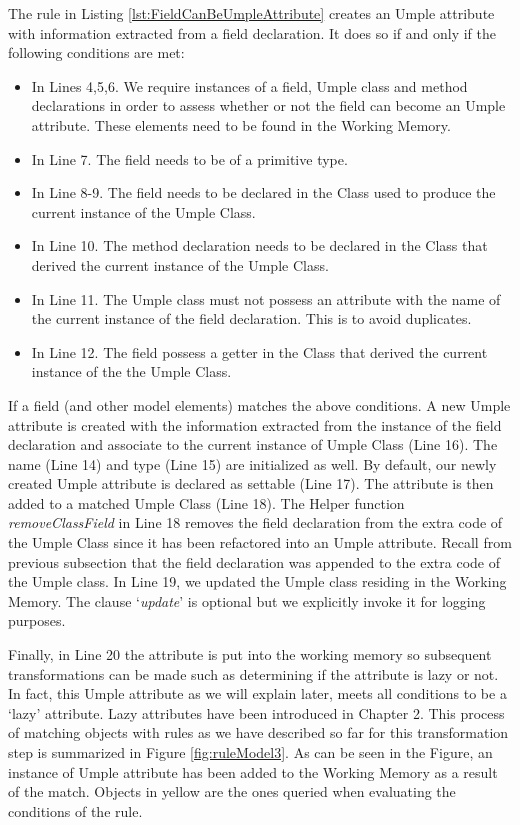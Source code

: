The rule in Listing \ref{lst:FieldCanBeUmpleAttribute} creates an Umple attribute with information extracted from a field declaration. It does so if and only if the following conditions are met:
\begin{itemize}
\item In Lines 4,5,6. We require instances of a field, Umple class and method declarations in order to assess whether or not the field can become an Umple attribute. These elements need to be found in the Working Memory. 

\item In Line 7. The field needs to be of a primitive type.

\item In Line 8-9. The field needs to be declared in the Class used to produce the current instance of the Umple Class.

\item In Line 10. The method declaration needs to be declared in the Class that derived the current instance of the Umple Class.

\item In Line 11. The Umple class must not possess an attribute with the name of the current instance of the field declaration. This is to avoid duplicates.

\item In Line 12. The field possess a getter in the Class that derived the current instance of the the Umple Class.
\end{itemize}

If a field (and other model elements) matches the above conditions. A new Umple attribute is created with the information extracted from the instance of the field declaration and associate to the current instance of Umple Class (Line 16). The name (Line 14) and type (Line 15) are initialized as well. By default, our newly created Umple attribute is declared as settable (Line 17). The attribute is then added to a matched Umple Class (Line 18). The Helper function \textit{removeClassField} in Line 18 removes the field declaration from the extra code of the Umple Class since it has been refactored into an Umple attribute. Recall from previous subsection that the field declaration was appended to the extra code of the Umple class. In Line 19, we updated the Umple class residing in the Working Memory. The clause `\textit{update}' is optional but we explicitly invoke it for logging purposes.

Finally, in Line 20 the attribute is put into the working memory so subsequent transformations can be made such as determining if the attribute is lazy or not. In fact, this Umple attribute as we will explain later, meets all conditions to be a `lazy' attribute. Lazy attributes have been introduced in Chapter 2. This process of matching objects with rules as we have described so far for this transformation step is summarized in Figure \ref{fig:ruleModel3}. As can be seen in the Figure, an instance of Umple attribute has been added to the Working Memory as a result of the match. Objects in yellow are the ones queried when evaluating the conditions of the rule. 

